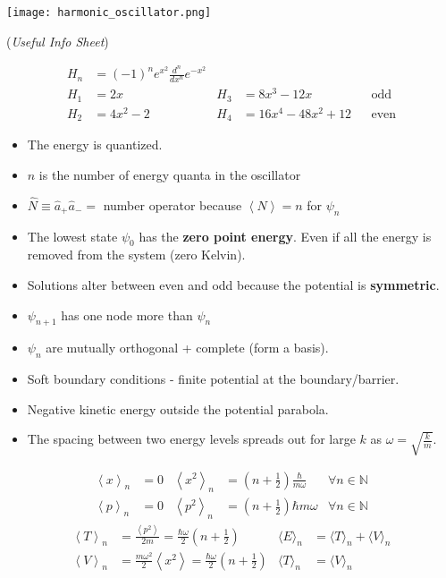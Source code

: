 \begin{center}
    \texttt{[image: harmonic\_oscillator.png]}
\end{center}

 (\textit{Useful Info Sheet})

\noindent\begin{align*}
    H_n & = {(-1)}^n e^{x^2} \frac{d^n}{dx^n} e^{-x^2}                                           \\
    H_1 & = 2x                                         & H_3 & = 8x^3-12x       &  & \text{odd}  \\
    H_2 & = 4x^2-2                                     & H_4 & = 16x^4-48x^2+12 &  & \text{even}
\end{align*}

\begin{itemize}
    \item The energy is quantized.
    \item $n$ is the number of energy quanta in the oscillator
    \item $\widehat{N} \equiv \widehat{a}_{+}\widehat{a}_{-} = $ number operator because $\left<N\right> = n$ for $\psi_n$
    \item The lowest state $\psi_0$ has the \textbf{zero point energy}. Even if all the energy is removed from the system (zero Kelvin).
    \item Solutions alter between even and odd because the potential is \textbf{symmetric}.
    \item $\psi_{n+1}$ has one node more than $\psi_n$
    \item $\psi_n$ are mutually orthogonal + complete (form a basis).
    \item Soft boundary conditions - finite potential at the boundary/barrier.
    \item Negative kinetic energy outside the potential parabola.
    \item The spacing between two energy levels spreads out for large $k$ as $\omega=\sqrt{\frac{k}{m}}$.
\end{itemize}

\noindent\begin{align*}
    \left\langle x \right\rangle _n & = 0 & \left\langle x^2 \right\rangle _n & = \left(n+\frac{1}{2}\right)\frac{\hbar}{m\omega} & \forall n \in \mathbb{N} \\
    \left\langle p \right\rangle _n & = 0 & \left\langle p^2 \right\rangle _n & = \left(n+\frac{1}{2}\right)\hbar m\omega         & \forall n \in \mathbb{N}
\end{align*}
\noindent\begin{align*}
    \left\langle T \right\rangle _n & = \frac{\left\langle p^2 \right\rangle}{2m} =  \frac{\hbar \omega}{2}\left(n+\frac{1}{2}\right)        & \langle E\rangle_n & =  \langle T\rangle_n +\langle V\rangle_n \\
    \left\langle V \right\rangle _n & = \frac{m\omega^2}{2}\left\langle x^2 \right\rangle = \frac{\hbar \omega}{2}\left(n+\frac{1}{2}\right) & \langle T\rangle_n & =  \langle V\rangle_n
\end{align*}

